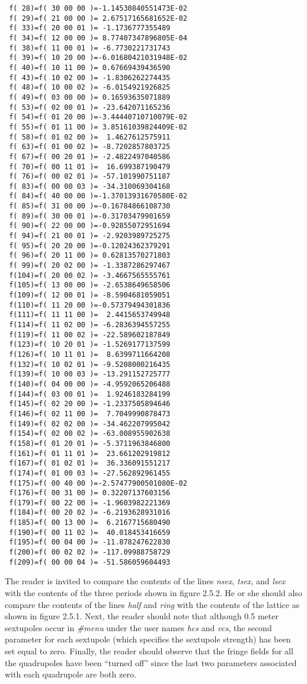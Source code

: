 {\begin{verbatim}
 f( 28)=f( 30 00 00 )=-1.14530840551473E-02
 f( 29)=f( 21 00 00 )= 2.67517165681652E-02
 f( 33)=f( 20 00 01 )= -1.1736777355489
 f( 34)=f( 12 00 00 )= 8.77407347896805E-04
 f( 38)=f( 11 00 01 )= -6.7730221731743
 f( 39)=f( 10 20 00 )=-6.01680421031948E-02
 f( 40)=f( 10 11 00 )= 0.67669439436590
 f( 43)=f( 10 02 00 )= -1.8306262274435
 f( 48)=f( 10 00 02 )= -6.0154921926825
 f( 49)=f( 03 00 00 )= 0.16593635071889
 f( 53)=f( 02 00 01 )= -23.642071165236
 f( 54)=f( 01 20 00 )=-3.44440710710079E-02
 f( 55)=f( 01 11 00 )= 3.85161039824409E-02
 f( 58)=f( 01 02 00 )=  1.4627612575911
 f( 63)=f( 01 00 02 )= -8.7202857803725
 f( 67)=f( 00 20 01 )= -2.4822497040586
 f( 70)=f( 00 11 01 )=  16.699387190479
 f( 76)=f( 00 02 01 )= -57.101990751187
 f( 83)=f( 00 00 03 )= -34.310069304168
 f( 84)=f( 40 00 00 )=-1.37013931670580E-02
 f( 85)=f( 31 00 00 )=-0.16784866108730
 f( 89)=f( 30 00 01 )=-0.31703479901659
 f( 90)=f( 22 00 00 )=-0.92855072951694
 f( 94)=f( 21 00 01 )= -2.9203989725275
 f( 95)=f( 20 20 00 )=-0.12024362379291
 f( 96)=f( 20 11 00 )= 0.62813570271803
 f( 99)=f( 20 02 00 )= -1.3387286297467
 f(104)=f( 20 00 02 )= -3.4667565555761
 f(105)=f( 13 00 00 )= -2.6538649658506
 f(109)=f( 12 00 01 )= -8.5904681059051
 f(110)=f( 11 20 00 )=-0.57379494301836
 f(111)=f( 11 11 00 )=  2.4415653749948
 f(114)=f( 11 02 00 )= -6.2836394557255
 f(119)=f( 11 00 02 )= -22.589602187849
 f(123)=f( 10 20 01 )= -1.5269177137599
 f(126)=f( 10 11 01 )=  8.6399711664208
 f(132)=f( 10 02 01 )= -9.5208000216435
 f(139)=f( 10 00 03 )= -13.291152725777
 f(140)=f( 04 00 00 )= -4.9592065206488
 f(144)=f( 03 00 01 )=  1.9246183284199
 f(145)=f( 02 20 00 )= -1.2337505894646
 f(146)=f( 02 11 00 )=  7.7049990878473
 f(149)=f( 02 02 00 )= -34.462207995042
 f(154)=f( 02 00 02 )= -63.008955902638
 f(158)=f( 01 20 01 )= -5.3711963846800
 f(161)=f( 01 11 01 )=  23.661202919812
 f(167)=f( 01 02 01 )=  36.336091551217
 f(174)=f( 01 00 03 )= -27.562892961455
 f(175)=f( 00 40 00 )=-2.57477900501080E-02
 f(176)=f( 00 31 00 )= 0.32207137603156
 f(179)=f( 00 22 00 )= -1.9603982221369
 f(184)=f( 00 20 02 )= -6.2193628931016
 f(185)=f( 00 13 00 )=  6.2167715680490
 f(190)=f( 00 11 02 )=  40.018453416659
 f(195)=f( 00 04 00 )= -11.878247622830
 f(200)=f( 00 02 02 )= -117.09988758729
 f(209)=f( 00 00 04 )= -51.586059604493

\end{verbatim}}

     The reader is invited to compare the contents of the lines {\em nsex}, {\em tsex},
and {\em lsex} with the contents of the three periods shown in figure 2.5.2.  He
or she should also compare the contents of the lines {\em half } and {\em ring } with the
contents of the lattice as shown in figure 2.5.1.  Next, the reader should
note that although 0.5 meter sextupoles occur in {\em \#menu} under the user names
{\em hcs } and {\em vcs}, the second parameter for each sextupole (which specifies the
sextupole strength) has been set equal to zero.  Finally, the reader should
observe that the fringe fields for all the quadrupoles have been ``turned
off'' since the last two parameters associated with each quadrupole are both
zero.

